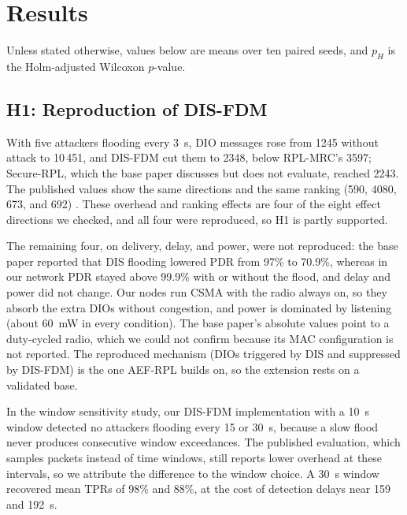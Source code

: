 \section{Results}\label{sec:results}
Unless stated otherwise, values below are means over ten paired seeds, and $p_H$ is the Holm-adjusted Wilcoxon $p$-value.

\subsection{H1: Reproduction of DIS-FDM}
With five attackers flooding every 3~s, DIO messages rose from 1245 without attack to 10\,451, and DIS-FDM cut them to 2348, below RPL-MRC's 3597; Secure-RPL, which the base paper discusses but does not evaluate, reached 2243. The published values show the same directions and the same ranking (590, 4080, 673, and 692) \cite{prajisha2025}. These overhead and ranking effects are four of the eight effect directions we checked, and all four were reproduced, so H1 is partly supported.

The remaining four, on delivery, delay, and power, were not reproduced: the base paper reported that DIS flooding lowered PDR from 97\% to 70.9\%, whereas in our network PDR stayed above 99.9\% with or without the flood, and delay and power did not change. Our nodes run CSMA with the radio always on, so they absorb the extra DIOs without congestion, and power is dominated by listening (about 60~mW in every condition). The base paper's absolute values point to a duty-cycled radio, which we could not confirm because its MAC configuration is not reported. The reproduced mechanism (DIOs triggered by DIS and suppressed by DIS-FDM) is the one AEF-RPL builds on, so the extension rests on a validated base.

In the window sensitivity study, our DIS-FDM implementation with a 10~s window detected no attackers flooding every 15 or 30~s, because a slow flood never produces consecutive window exceedances. The published evaluation, which samples packets instead of time windows, still reports lower overhead at these intervals, so we attribute the difference to the window choice. A 30~s window recovered mean TPRs of 98\% and 88\%, at the cost of detection delays near 159 and 192~s.

